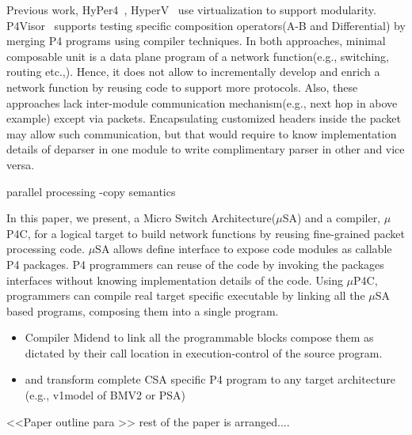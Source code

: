 Previous work, HyPer4~\cite{Hancock:2016:HUP:2999572.2999607}, HyperV~\cite{8038396} use virtualization to support modularity.
P4Visor~\cite{Zheng:2018:PLV:3281411.3281436} supports testing specific composition operators(A-B and Differential) by merging P4 programs using compiler techniques.
In both approaches, minimal composable unit is a data plane program of a network function(e.g., switching, routing etc.,). 
Hence, it does not allow to incrementally develop and enrich a network function by reusing code to support more protocols.
Also, these approaches lack inter-module communication mechanism(e.g., next hop in above example) except via packets.
Encapsulating customized headers inside the packet may allow such communication, but that would require to know
implementation details of deparser in one module to write complimentary parser in other and vice versa. 

parallel processing -copy semantics


In this paper, we present, a Micro Switch Architecture($\mu$SA) and a compiler, $\mu$P4C, for a logical target to build network functions by reusing fine-grained packet processing code.
$\mu$SA allows define interface to expose code modules as callable P4 packages.
P4 programmers can reuse of the code by invoking the packages interfaces without knowing implementation details of the code.
Using $\mu$P4C, programmers can compile real target specific executable by linking all the $\mu$SA based programs, composing them into a single program.
\begin{itemize}
 \item Compiler Midend to link all the programmable blocks compose them as dictated by their call location in execution-control of the source program.
 \item and transform complete CSA specific P4 program to any target architecture (e.g., v1model of BMV2 or PSA)
\end{itemize}

%  
% 
%  
%  
%  

<<Paper outline para  >> rest of the paper is arranged....
